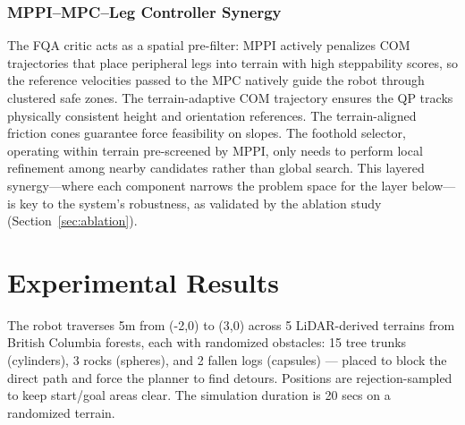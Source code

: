 \documentclass[letterpaper, 10 pt, conference]{ieeeconf}  %
\begin{document}
\subsubsection{MPPI--MPC--Leg Controller Synergy}
The FQA critic acts as a spatial pre-filter: MPPI actively penalizes COM trajectories that place peripheral legs into terrain with high steppability scores, so the reference velocities passed to the MPC natively guide the robot through clustered safe zones. The terrain-adaptive COM trajectory ensures the QP tracks physically consistent height and orientation references. The terrain-aligned friction cones guarantee force feasibility on slopes. The foothold selector, operating within terrain pre-screened by MPPI, only needs to perform local refinement among nearby candidates rather than global search. This layered synergy---where each component narrows the problem space for the layer below---is key to the system's robustness, as validated by the ablation study (Section~\ref{sec:ablation}).


\section{Experimental Results}

The robot traverses 5m from (-2,0) to (3,0) across 5 LiDAR-derived terrains from British Columbia forests, each with randomized obstacles: 15 tree trunks (cylinders), 3 rocks (spheres), and 2 fallen logs (capsules) — placed to block the direct path and force the planner to find detours. Positions are rejection-sampled to keep start/goal areas clear. The simulation duration is 20 secs on a randomized terrain.
\end{document}
